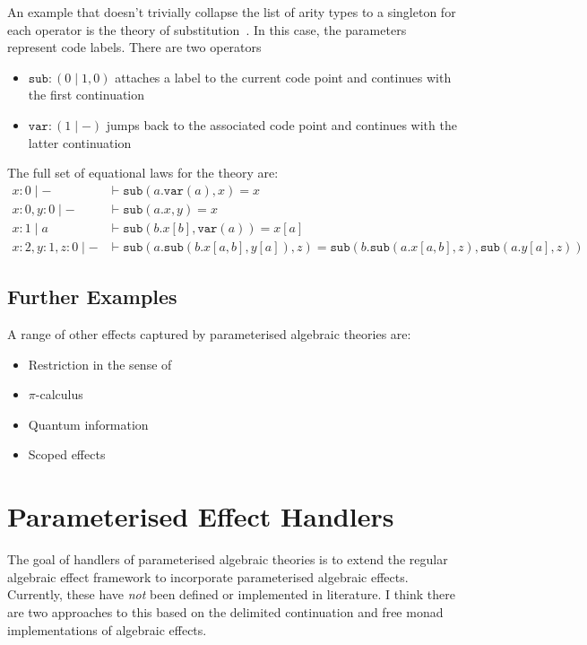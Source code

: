 \documentclass{scrartcl}
\theoremstyle{definition}
\newcommand{\sub}{\mathtt{sub}}
\newcommand{\var}{\mathtt{var}}
\begin{document}
An example that doesn't trivially collapse the list of arity types to a singleton for each operator is the theory of substitution~\cite{fiore_substitution_2014}. In this case, the parameters represent code labels. There are two operators
\begin{itemize}
    \item $\sub : (0\mid 1, 0)$ attaches a label to the current code point and continues with the first continuation
    \item $\var : (1 \mid -)$ jumps back to the associated code point and continues with the latter continuation
\end{itemize}
The full set of equational laws for the theory are:
\begin{align*}
    x: 0 \mid - &\vdash \sub(a.\var(a), x) = x \\
    x: 0, y:0 \mid - &\vdash \sub(a.x,y) = x \\
    x: 1 \mid a &\vdash \sub(b.x[b], \var(a)) = x[a] \\
    x:2, y:1, z:0 \mid - &\vdash
    \sub(a.\sub(b.x[a, b], y[a]), z) = \sub(b.\sub(a.x[a, b], z), \sub(a.y[a], z))
\end{align*}

\subsection{Further Examples}

A range of other effects captured by parameterised algebraic theories are:
\begin{itemize}
    \item Restriction \cite{staton_instances_2013} in the sense of \cite{pitts_structural_2011}
    \item $\pi$-calculus \cite{staton_instances_2013}
    \item Quantum information \cite{staton_algebraic_2015}
    \item Scoped effects~\cite{lindley_scoped_2024}
\end{itemize}

\section{Parameterised Effect Handlers}

The goal of handlers of parameterised algebraic theories is to extend the regular algebraic effect framework to incorporate parameterised algebraic effects. Currently, these have \emph{not} been defined or implemented in literature. I think there are two approaches to this based on the delimited continuation and free monad implementations of algebraic effects.
\end{document}
